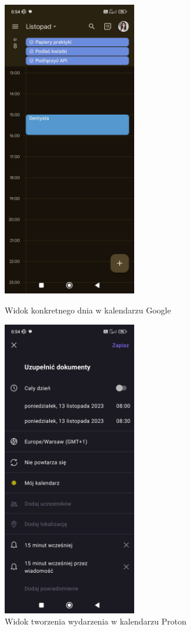 \begin{figure}[ht]
  \begin{minipage}{0.4\textwidth}
    \centering
    \includegraphics[height=13cm, keepaspectratio]{images/analiza/googleCalendar}
    \caption{Widok konkretnego dnia w kalendarzu Google}
    \label{fig:googleCalendar}
  \end{minipage}
  \hfill
  \begin{minipage}{0.4\textwidth}
    \centering
    \includegraphics[height=13cm, keepaspectratio]{images/analiza/protonCalendar}
    \caption{Widok tworzenia wydarzenia w kalendarzu Proton}
    \label{fig:protonCalendar}
  \end{minipage}
\end{figure}

